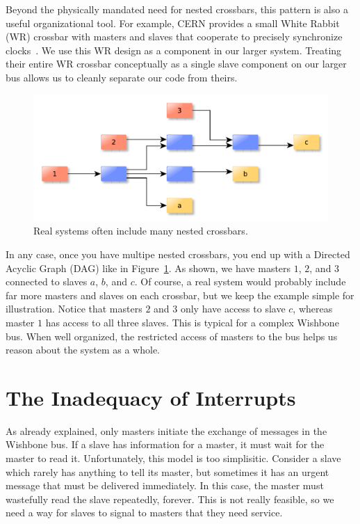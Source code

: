 \documentclass[a4paper]{jacow}
\begin{document}
Beyond the physically mandated need for nested crossbars,
this pattern is also a useful organizational tool.
For example, CERN provides a small White Rabbit (WR) crossbar with masters
and slaves that cooperate to precisely synchronize clocks~\cite{wr}.
We use this WR design as a component in our larger system.
Treating their entire WR crossbar conceptually as a single slave component on
our larger bus allows us to cleanly separate our code from theirs.

\begin{figure}[t]
  \centering
  \includegraphics*[width=\columnwidth]{complex-bus}
  \caption{Real systems often include many nested crossbars.}
  \label{fig:complex-bus}
\end{figure}

In any case, once you have multipe nested crossbars, you end up with a
Directed Acyclic Graph (DAG) like in Figure~\ref{fig:complex-bus}.
As shown, we have masters $1$, $2$, and $3$ connected to slaves $a$, $b$, and $c$.
Of course, a real system would probably include far more masters and slaves on each
crossbar, but we keep the example simple for illustration.
Notice that masters $2$ and $3$ only have access to slave $c$,
whereas master $1$ has access to all three slaves.
This is typical for a complex Wishbone bus.
When well organized, the restricted access of masters to the bus helps
us reason about the system as a whole.

\section{The Inadequacy of Interrupts}

As already explained,
only masters initiate the exchange of messages in the Wishbone bus.
If a slave has information for a master, it must wait for the master to read it.
Unfortunately, this model is too simplisitic.
Consider a slave which rarely has anything to tell its master,
but sometimes it has an urgent message that must be delivered immediately.
In this case, the master must wastefully read the slave repeatedly, forever.
This is not really feasible, so we need a way for slaves to signal to
masters that they need service.
\end{document}
